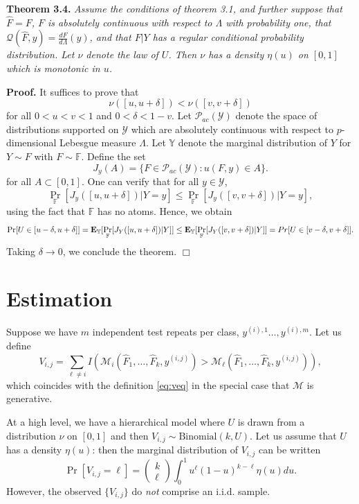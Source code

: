 \documentclass[12pt]{article}
\begin{document}
\noindent\textbf{Theorem 3.4.} \emph{ Assume the conditions of theorem 3.1, and further suppose
that $\hat{F} = F$, $F$ is absolutely continuous with respect to $\Lambda$ with probability one,
that $\mathcal{Q}(\hat{F}, y) = \frac{dF}{d\Lambda}(y)$, and that $F|Y$ has a regular conditional probability distribution.
Let $\nu$ denote the law of $U$.    Then $\nu$ has a density $\eta(u)$ on $[0, 1]$ which is monotonic in $u$.
}

\noindent\textbf{Proof.}
It suffices to prove that
\[
\nu([u, u + \delta]) < \nu([v, v + \delta])
\]
for all $0 < u < v < 1$ and $0 < \delta < 1-v$.
Let $\mathcal{P}_{ac}(\mathcal{Y})$ denote the space of distributions supported on $\mathcal{Y}$ which are
absolutely continuous with respect to $p$-dimensional Lebesgue measure $\Lambda$.
Let $\mathbb{Y}$ denote the marginal distribution of $Y$ for $Y \sim F$ with $F \sim \mathbb{F}$.
Define the set 
\[
J_y(A) =\{F \in \mathcal{P}_{ac}(\mathcal{Y}): u(F, y) \in A\}.
\]
for all $A \subset [0, 1].$
One can verify that for all $y \in \mathcal{Y}$,
\[
\Pr_\mathbb{F}[J_y([u, u + \delta])|Y=y] \leq \Pr_\mathbb{F}[J_y([v, v + \delta])|Y=y],
\]
using the fact that $\mathbb{F}$ has no atoms.  Hence, we obtain
\[
\Pr[U \in [u-\delta, u + \delta]] = \textbf{E}_{\mathbb{Y}}[\Pr_\mathbb{F}[J_Y([u, u + \delta])|Y]] 
\leq \textbf{E}_{\mathbb{Y}}[\Pr_\mathbb{F}[J_Y([v, v + \delta])|Y]]  = Pr[U \in [v - \delta, v + \delta]].
\]
Taking $\delta \to 0$, we conclude the theorem. $\Box$\newline

\section{Estimation}

Suppose we have $m$ independent test repeats per class, $y^{(i),1}\hdots, y^{(i), m}$.
Let us define
\[
V_{i,j} = \sum_{\ell\neq i} I(\mathcal{M}_i(\hat{F}_1,\hdots, \hat{F}_k, y^{(i, j)})  > \mathcal{M}_\ell(\hat{F}_1,\hdots, \hat{F}_k, y^{(i, j)})),
\]
which coincides with the definition \eqref{eq:veq} in the special case that $\mathcal{M}$ is generative.

At a high level, we have a hierarchical model where $U$ is drawn from a distribution $\nu$ on $[0, 1]$
and then $V_{i, j} \sim \text{Binomial}(k, U)$.
Let us assume that $U$ has a density $\eta(u)$: then the marginal distribution of $V_{i, j}$ can be written
\[
\Pr[V_{i,j} = \ell] = \begin{pmatrix}
k \\ \ell
\end{pmatrix}
\int_0^1 u^\ell (1-u)^{k-\ell} \eta(u) du.
\]
However, the observed $\{V_{i, j}\}$ do \emph{not} comprise an i.i.d. sample.
\end{document}
